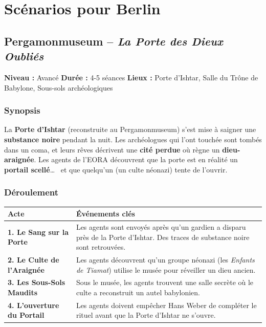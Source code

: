 \documentclass[10pt,a5paper,twoside]{book}
\begin{document}
\newpage

\section{Scénarios pour Berlin}
\subsection{Pergamonmuseum -- \textit{La Porte des Dieux Oubliés}}

\begin{shaded}
	\textbf{Niveau :} Avancé \quad
	\textbf{Durée :} 4-5 séances \quad
	\textbf{Lieux :} Porte d'Ishtar, Salle du Trône de Babylone, Sous-sols archéologiques
\end{shaded}

\subsubsection*{Synopsis}
La \textbf{Porte d'Ishtar} (reconstruite au Pergamonmuseum) s'est mise à saigner une \textbf{substance noire} pendant la nuit. Les archéologues qui l'ont touchée sont tombés dans un coma, et leurs rêves décrivent une \textbf{cité perdue} où règne un \textbf{dieu-araignée}. Les agents de l'EORA découvrent que la porte est en réalité un \textbf{portail scellé}\ldots~  et que quelqu'un (un culte néonazi) tente de l'ouvrir.

\subsubsection*{Déroulement}
\begin{center}
	\begin{tabular}{|P{3cm}|P{9cm}|}
	\hline
	\textbf{Acte} 						& \textbf{Événements clés} \\ \hline
	\textbf{1. Le Sang sur la Porte} 	& Les agents sont envoyés après qu'un gardien a disparu près de la Porte d'Ishtar. Des traces de substance noire sont retrouvées. \\ \hline
	\textbf{2. Le Culte de l'Araignée} 	& Les agents découvrent qu'un groupe néonazi (les \textit{Enfants de Tiamat}) utilise le musée pour réveiller un dieu ancien. \\ \hline
	\textbf{3. Les Sous-Sols Maudits} 	& Sous le musée, les agents trouvent une salle secrète où le culte a reconstruit un autel babylonien. \\ \hline
	\textbf{4. L'ouverture du Portail} 	& Les agents doivent empêcher Hans Weber de compléter le rituel avant que la Porte d'Ishtar ne s'ouvre. \\ \hline
	\end{tabular}
\end{center}
\end{document}
